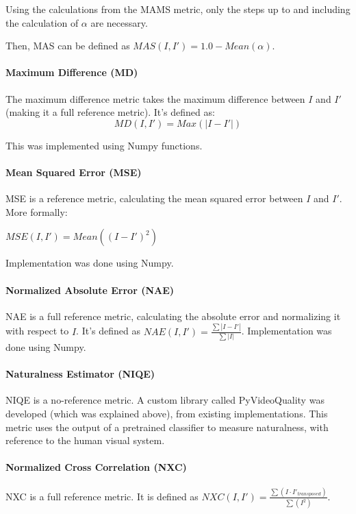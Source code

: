 \documentclass[10pt,a4paper]{article}
\begin{document}
            Using the calculations from the MAMS metric, only the steps up to and including the calculation of $\alpha$ are necessary. 

            Then, MAS can be defined as $MAS(I, I') = 1.0 - Mean(\alpha)$.

            \paragraph{Maximum Difference (MD)}
                The maximum difference metric takes the maximum difference between $I$ and $I'$ (making it a full reference metric). It's defined as:
                $$MD(I, I') = Max(|I - I'|)$$

                This was implemented using Numpy functions.

            \paragraph{Mean Squared Error (MSE)}
                MSE is a reference metric, calculating the mean squared error between $I$ and $I'$. More formally:

                $MSE(I, I') = Mean((I - I')^ 2)$

                Implementation was done using Numpy.
            \paragraph{Normalized Absolute Error (NAE)}
                NAE is a full reference metric, calculating the absolute error and normalizing it with respect to $I$. It's defined as $NAE(I, I') = \frac{\sum |I - I'|}{\sum |I|}$. \cite{ImageQualityAssessmentTest}
                Implementation was done using Numpy.
            \paragraph{Naturalness Estimator (NIQE)}
                NIQE is a no-reference metric.
                A custom library called PyVideoQuality was developed (which was explained above), from existing implementations. This metric uses the output of a pretrained classifier
                to measure naturalness, with reference to the human visual system.

            \paragraph{Normalized Cross Correlation (NXC)}
                NXC is a full reference metric. It is defined as $NXC(I, I') = \frac{\sum (I \cdot I'_{transposed})}{\sum (I^2)}$. \cite{ImageQualityAssessmentTest}
\end{document}
